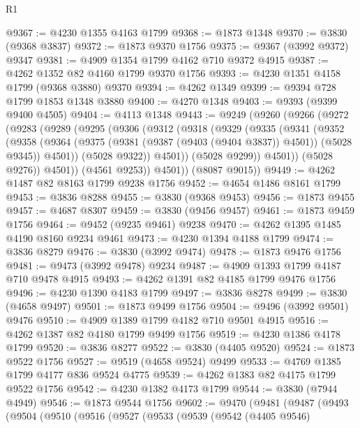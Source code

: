\begin{lexlean}{R1}
\begin{coremodule}
@9367 := @4230 @1355 @4163 @1799
@9368 := @1873 @1348
@9370 := @3830 (@9368 @3837)
@9372 := @1873 @9370 @1756
@9375 := @9367 (@3992 @9372) @9347
@9381 := @4909 @1354 @1799 @4162 @710 @9372 @4915
@9387 := @4262 @1352 @82 @4160 @1799 @9370 @1756
@9393 := @4230 @1351 @4158 @1799 (@9368 @3880) @9370
@9394 := @4262 @1349
@9399 := @9394 @728 @1799 @1853 @1348 @3880
@9400 := @4270 @1348
@9403 := @9393 (@9399 @9400 @4505)
@9404 := @4113 @1348
@9443 := @9249
    (@9260
      (@9266
        (@9272
          (@9283
            (@9289
              (@9295
                (@9306
                  (@9312
                    (@9318
                      (@9329
                        (@9335
                          (@9341
                            (@9352
                              (@9358
                                (@9364
                                  (@9375 (@9381 (@9387 (@9403 (@9404 @3837)) @4501)) (@5028 @9345))
                                  @4501))
                              (@5028 @9322))
                            @4501))
                        (@5028 @9299))
                      @4501))
                  (@5028 @9276))
                @4501))
            (@4561 @9253))
          @4501))
      (@8087 @9015))
@9449 := @4262 @1487 @82 @8163 @1799 @9238 @1756
@9452 := @4654 @1486 @8161 @1799
@9453 := @3836 @8288
@9455 := @3830 (@9368 @9453)
@9456 := @1873 @9455
@9457 := @4687 @8307
@9459 := @3830 (@9456 @9457)
@9461 := @1873 @9459 @1756
@9464 := @9452 (@9235 @9461) @9238
@9470 := @4262 @1395 @1485 @4190 @8160 @9234 @9461
@9473 := @4230 @1394 @4188 @1799
@9474 := @3836 @8279
@9476 := @3830 (@3992 @9474)
@9478 := @1873 @9476 @1756
@9481 := @9473 (@3992 @9478) @9234
@9487 := @4909 @1393 @1799 @4187 @710 @9478 @4915
@9493 := @4262 @1391 @82 @4185 @1799 @9476 @1756
@9496 := @4230 @1390 @4183 @1799
@9497 := @3836 @8278
@9499 := @3830 (@4658 @9497)
@9501 := @1873 @9499 @1756
@9504 := @9496 (@3992 @9501) @9476
@9510 := @4909 @1389 @1799 @4182 @710 @9501 @4915
@9516 := @4262 @1387 @82 @4180 @1799 @9499 @1756
@9519 := @4230 @1386 @4178 @1799
@9520 := @3836 @8277
@9522 := @3830 (@4405 @9520)
@9524 := @1873 @9522 @1756
@9527 := @9519 (@4658 @9524) @9499
@9533 := @4769 @1385 @1799 @4177 @836 @9524 @4775
@9539 := @4262 @1383 @82 @4175 @1799 @9522 @1756
@9542 := @4230 @1382 @4173 @1799
@9544 := @3830 (@7944 @4949)
@9546 := @1873 @9544 @1756
@9602 := @9470
    (@9481
      (@9487
        (@9493
          (@9504
            (@9510
              (@9516
                (@9527
                  (@9533
                    (@9539
                      (@9542
                        (@4405 @9546)

\end{coremodule}
\end{lexlean}

